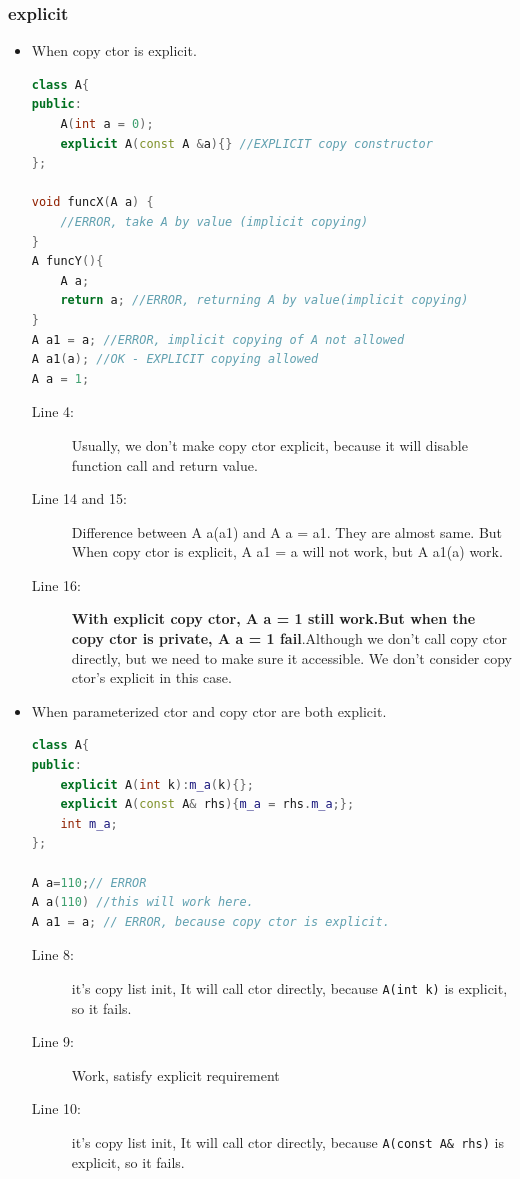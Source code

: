 \documentclass[a4paper,11pt,twoside]{book}
\begin{document}
\subsubsection{explicit}
\begin{itemize}
	\item When copy ctor is explicit.
\begin{lstlisting}[frame=single, language=c++]
class A{
public:
	A(int a = 0);
	explicit A(const A &a){} //EXPLICIT copy constructor
};
	
void funcX(A a) {
	//ERROR, take A by value (implicit copying)
}
A funcY(){ 
	A a;
	return a; //ERROR, returning A by value(implicit copying)
}
A a1 = a; //ERROR, implicit copying of A not allowed
A a1(a); //OK - EXPLICIT copying allowed
A a = 1;
\end{lstlisting}
	\begin{description}
		\item[Line 4:] Usually, we don't make copy ctor explicit, because it will disable function call and return value.
		
		\item[Line 14 and 15:] Difference between A a(a1) and A a = a1.  They are almost same. But When copy ctor is explicit,  A a1 = a will not work, but A a1(a) work.
		
		\item[Line 16:] \textbf{With explicit copy ctor, A a = 1 still work.But when the copy ctor is private, A a = 1 fail}.Although we don't call copy ctor directly, but we need to make sure it accessible. We don't consider copy ctor's explicit in this case.
	\end{description}
	
	\item When parameterized ctor and copy ctor are both explicit.
\begin{lstlisting}[frame=single, language=c++]
class A{
public:
	explicit A(int k):m_a(k){};
	explicit A(const A& rhs){m_a = rhs.m_a;};
	int m_a;
};
	
A a=110;// ERROR
A a(110) //this will work here.
A a1 = a; // ERROR, because copy ctor is explicit.
\end{lstlisting}
	\begin{description}
		\item[Line 8:] it's copy list init, It will call ctor directly, because \texttt{A(int k)} is explicit, so it fails.
		\item[Line 9:] Work, satisfy explicit requirement
		\item[Line 10:] it's copy list init, It will call ctor directly, because \texttt{A(const A\& rhs)} is explicit, so it fails.
	\end{description}
	

\end{itemize}
\end{document}
